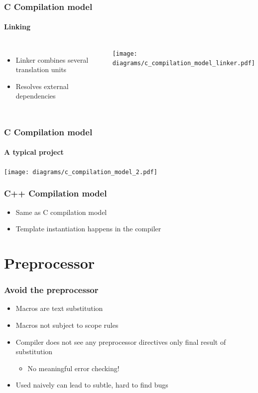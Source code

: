 \documentclass[table]{beamer}
\newcounter{rulecount}
\newcommand{\declarerule}{\textbf{\color{themeblue}{Rule \therulecount:}} }
\begin{document}
\begin{frame}
    \frametitle{C Compilation model}
    \framesubtitle{Linking}
    \begin{columns}[t]
        \column{4cm}
        \begin{itemize}
            \item Linker combines several translation units
            \item Resolves external dependencies
        \end{itemize}
        \column[T]{8cm}
        \texttt{[image: diagrams/c\_compilation\_model\_linker.pdf]}
    \end{columns}
\end{frame}

\begin{frame}
    \frametitle{C Compilation model}
    \framesubtitle{A typical project}
    \texttt{[image: diagrams/c\_compilation\_model\_2.pdf]}
\end{frame}

\begin{frame}
    \frametitle{\alert{C++} Compilation model}
    \begin{itemize}
        \item Same as C compilation model
        \item Template instantiation happens in the compiler
    \end{itemize}
\end{frame}

\section{Preprocessor}
\frame{\sectionpage}

\begin{frame}
    \frametitle{\declarerule Avoid the preprocessor}
    \begin{itemize}
        \item Macros are text substitution
        \item Macros not subject to scope rules
        \item Compiler does not see any preprocessor directives only final result of substitution
            \begin{itemize}
                \item No meaningful error checking!
            \end{itemize}
        \item Used naively can lead to subtle, hard to find bugs
    \end{itemize}
\end{frame}
\end{document}
